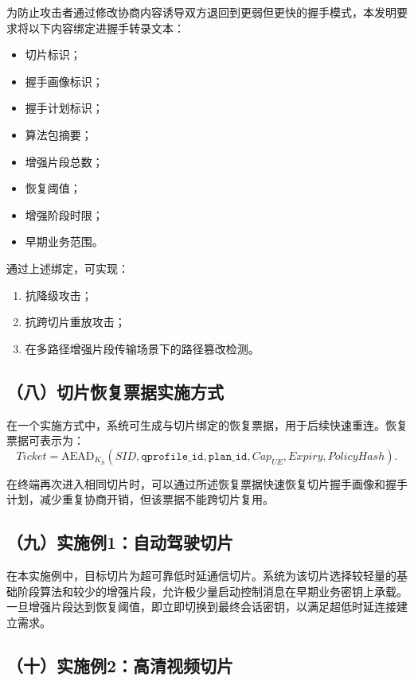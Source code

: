 \documentclass[12pt,a4paper]{article}
\begin{document}
为防止攻击者通过修改协商内容诱导双方退回到更弱但更快的握手模式，本发明要求将以下内容绑定进握手转录文本：

\begin{itemize}[leftmargin=2em]
    \item 切片标识；
    \item 握手画像标识；
    \item 握手计划标识；
    \item 算法包摘要；
    \item 增强片段总数；
    \item 恢复阈值；
    \item 增强阶段时限；
    \item 早期业务范围。
\end{itemize}

通过上述绑定，可实现：

\begin{enumerate}[leftmargin=2em]
    \item 抗降级攻击；
    \item 抗跨切片重放攻击；
    \item 在多路径增强片段传输场景下的路径篡改检测。
\end{enumerate}

\subsection*{（八）切片恢复票据实施方式}

在一个实施方式中，系统可生成与切片绑定的恢复票据，用于后续快速重连。恢复票据可表示为：
\[
Ticket = \mathrm{AEAD}_{K_S}(SID, \texttt{qprofile\_id}, \texttt{plan\_id}, Cap_{UE}, Expiry, PolicyHash).
\]

在终端再次进入相同切片时，可以通过所述恢复票据快速恢复切片握手画像和握手计划，减少重复协商开销，但该票据不能跨切片复用。

\subsection*{（九）实施例1：自动驾驶切片}

在本实施例中，目标切片为超可靠低时延通信切片。系统为该切片选择较轻量的基础阶段算法和较少的增强片段，允许极少量启动控制消息在早期业务密钥上承载。一旦增强片段达到恢复阈值，即立即切换到最终会话密钥，以满足超低时延连接建立需求。

\subsection*{（十）实施例2：高清视频切片}
\end{document}
